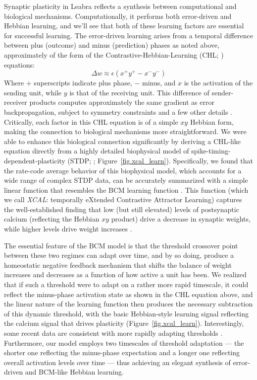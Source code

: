 \documentclass[11pt,twoside]{article}
\newif\myifpdf
\begin{document}
Synaptic plasticity in Leabra reflects a synthesis between computational and biological mechanisms.  Computationally, it performs both error-driven and Hebbian learning, and we'll see that both of these learning factors are essential for successful learning.  The error-driven learning arises from a temporal difference between plus (outcome) and minus (prediction) phases as noted above, approximately of the form of the Contrastive-Hebbian-Learning (CHL; ) equations:
\begin{equation}
  \Delta w \approx \epsilon \left( x^+ y^+ - x^- y^- \right)
  \label{eq.chl}
\end{equation}
Where $+$ superscripts indicate plus phase, $-$ minus, and $x$ is the activation of the sending unit, while $y$ is that of the receiving unit.  This difference of sender-receiver products computes approximately the same gradient as error backpropagation, subject to symmetry constraints and a few other details \cite{OReilly96,XieSeung03,ScellierBengio17}.  Critically, each factor in this CHL equation is of a simple $x y$ Hebbian form, making the connection to biological mechanisms more straightforward.  We were able to enhance this biological connection significantly by deriving a CHL-like equation directly from a highly detailed biophysical model of spike-timing-dependent-plasticity (STDP;  ;  Figure~\ref{fig.xcal_learn}).  Specifically, we found that the rate-code average behavior of this biophysical model, which accounts for a wide range of complex STDP data, can be accurately summarized with a simple linear function that resembles the BCM learning function \cite{BienenstockCooperMunro82,CooperIntratorBlaisEtAl04,ShouvalWangWittenberg10}.  This function (which we call {\em XCAL}: temporally eXtended Contrastive Attractor Learning) captures the well-established finding that low (but still elevated) levels of postsynaptic calcium (reflecting the Hebbian $x y$ product) drive a decrease in synaptic weights, while higher levels drive weight increases \cite{ArtolaBrocherSinger90,Lisman90,Lisman95,BearMalenka94}.

The essential feature of the BCM model is that the threshold crossover point between these two regimes can adapt over time, and by so doing, produce a homeostatic negative feedback mechanism that shifts the balance of weight increases and decreases as a function of how active a unit has been.  We realized that if such a threshold were to adapt on a rather more rapid timescale, it could reflect the minus-phase activation state as shown in the CHL equation above, and the linear nature of the learning function then produces the necessary subtraction of this dynamic threshold, with the basic Hebbian-style learning signal reflecting the calcium signal that drives plasticity (Figure~\ref{fig.xcal_learn}).  Interestingly, some recent data are consistent with more rapidly adapting thresholds \cite{LimMcKeeWoloszynEtAl15,JedlickaBenuskovaAbraham15,ZenkeGerstnerGanguli17}.  Furthermore, our model employs two timescales of threshold adaptation --- the shorter one reflecting the minus-phase expectation and a longer one reflecting overall activation levels over time --- thus achieving an elegant synthesis of  error-driven and BCM-like Hebbian learning.
\end{document}
